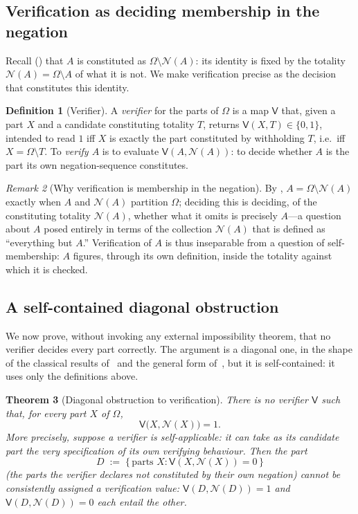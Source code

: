 \documentclass[11pt,a4paper]{article}
\theoremstyle{thmstyle}
\newtheorem{theorem}{Theorem}[section]
\theoremstyle{definition}
\newtheorem{definition}[theorem]{Definition}
\theoremstyle{remark}
\newtheorem{remark}[theorem]{Remark}
\newcommand{\Space}{\Omega}
\newcommand{\Neg}{\mathcal{N}}
\newcommand{\Ver}{\mathsf{V}}
\begin{document}
\subsection{Verification as deciding membership in the negation}

Recall () that $A$ is constituted as $\Space\setminus\Neg(A)$:
its identity is fixed by the totality $\Neg(A)=\Space\setminus A$ of what it is
not. We make verification precise as the decision that constitutes this identity.

\begin{definition}[Verifier]
\label{def:verifier}
A \emph{verifier} for the parts of $\Space$ is a map $\Ver$ that, given a part
$X$ and a candidate constituting totality $T$, returns $\Ver(X,T)\in\{0,1\}$,
intended to read $1$ iff $X$ is exactly the part constituted by withholding $T$,
i.e.\ iff $X=\Space\setminus T$. To \emph{verify $A$} is to evaluate
$\Ver(A,\Neg(A))$: to decide whether $A$ is the part its own negation-sequence
constitutes.
\end{definition}

\begin{remark}[Why verification is membership in the negation]
\label{rem:ver-membership}
By , $A=\Space\setminus\Neg(A)$ exactly when $A$ and $\Neg(A)$
partition $\Space$; deciding this is deciding, of the constituting totality
$\Neg(A)$, whether what it omits is precisely $A$---a question about $A$ posed
entirely in terms of the collection $\Neg(A)$ that is defined as
``everything but $A$.'' Verification of $A$ is thus inseparable from a question
of self-membership: $A$ figures, through its own definition, inside the totality
against which it is checked.
\end{remark}

\subsection{A self-contained diagonal obstruction}

We now prove, without invoking any external impossibility theorem, that no
verifier decides every part correctly. The argument is a diagonal one, in the
shape of the classical results of~\citet{russell1903,cantor1891,tarski1936} and
the general form of~\citet{lawvere1969}, but it is self-contained: it uses only
the definitions above.

\begin{theorem}[Diagonal obstruction to verification]
\label{thm:diagonal}
There is no verifier $\Ver$ such that, for every part $X$ of $\Space$,
\[
\Ver\bigl(X,\Neg(X)\bigr)=1 .
\]
More precisely, suppose a verifier is \emph{self-applicable}: it can take as its
candidate part the very specification of its own verifying behaviour. Then the
part
\[
D\;:=\;\bigl\{\,\text{parts } X : \Ver(X,\Neg(X))=0\,\bigr\}
\]
\textup{(}the parts the verifier declares not constituted by their own
negation\textup{)} cannot be consistently assigned a verification value:
$\Ver(D,\Neg(D))=1$ and $\Ver(D,\Neg(D))=0$ each entail the other.
\end{theorem}
\end{document}
